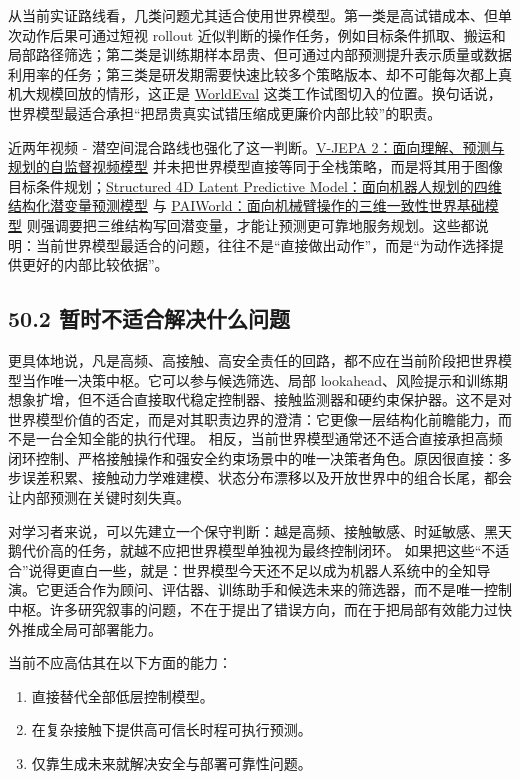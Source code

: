 从当前实证路线看，几类问题尤其适合使用世界模型。第一类是高试错成本、但单次动作后果可通过短视 rollout 近似判断的操作任务，例如目标条件抓取、搬运和局部路径筛选；第二类是训练期样本昂贵、但可通过内部预测提升表示质量或数据利用率的任务；第三类是研发期需要快速比较多个策略版本、却不可能每次都上真机大规模回放的情形，这正是 \href{https://arxiv.org/abs/2505.19017}{WorldEval} 这类工作试图切入的位置。换句话说，世界模型最适合承担“把昂贵真实试错压缩成更廉价内部比较”的职责。

近两年视频 - 潜空间混合路线也强化了这一判断。\href{https://arxiv.org/abs/2506.09985}{V-JEPA 2：面向理解、预测与规划的自监督视频模型} 并未把世界模型直接等同于全栈策略，而是将其用于图像目标条件规划；\href{https://arxiv.org/abs/2607.01166}{Structured 4D Latent Predictive Model：面向机器人规划的四维结构化潜变量预测模型} 与 \href{https://arxiv.org/abs/2606.18375}{PAIWorld：面向机械臂操作的三维一致性世界基础模型} 则强调要把三维结构写回潜变量，才能让预测更可靠地服务规划。这些都说明：当前世界模型最适合的问题，往往不是“直接做出动作”，而是“为动作选择提供更好的内部比较依据”。

\subsection*{50.2 暂时不适合解决什么问题}


更具体地说，凡是高频、高接触、高安全责任的回路，都不应在当前阶段把世界模型当作唯一决策中枢。它可以参与候选筛选、局部 lookahead、风险提示和训练期想象扩增，但不适合直接取代稳定控制器、接触监测器和硬约束保护器。这不是对世界模型价值的否定，而是对其职责边界的澄清：它更像一层结构化前瞻能力，而不是一台全知全能的执行代理。 相反，当前世界模型通常还不适合直接承担高频闭环控制、严格接触操作和强安全约束场景中的唯一决策者角色。原因很直接：多步误差积累、接触动力学难建模、状态分布漂移以及开放世界中的组合长尾，都会让内部预测在关键时刻失真。

对学习者来说，可以先建立一个保守判断：越是高频、接触敏感、时延敏感、黑天鹅代价高的任务，就越不应把世界模型单独视为最终控制闭环。 如果把这些“不适合”说得更直白一些，就是：世界模型今天还不足以成为机器人系统中的全知导演。它更适合作为顾问、评估器、训练助手和候选未来的筛选器，而不是唯一控制中枢。许多研究叙事的问题，不在于提出了错误方向，而在于把局部有效能力过快外推成全局可部署能力。

当前不应高估其在以下方面的能力：

\begin{enumerate}
\item 直接替代全部低层控制模型。
\item 在复杂接触下提供高可信长时程可执行预测。
\item 仅靠生成未来就解决安全与部署可靠性问题。
\end{enumerate}

